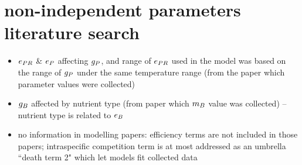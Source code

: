 \documentclass[../thesis.tex]{subfiles} %
\begin{document}
\section{non-independent parameters literature search}
\begin{itemize}
    \item $e_{PR}$ \& $e_P$ affecting $g_P$, and range of $e_{PR}$ used in the model was based on the range of $g_P$ under the same temperature range (from the paper which parameter values were collected)
    \item $g_B$ affected by nutrient type (from paper which $m_B$ value was collected) -- nutrient type is related to $e_B$
    \item no information in modelling papers: efficiency terms are not included in those papers; intraspecific competition term is at most addressed as an umbrella ``death term 2" which let models fit collected data
\end{itemize}
\end{document}
